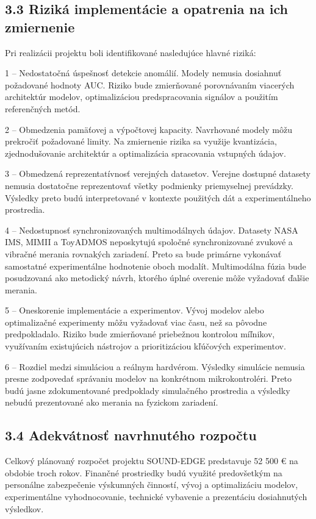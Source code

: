 \documentclass[10pt,a4paper]{article}
\begin{document}
\subsection*{3.3 Riziká implementácie
a opatrenia na ich zmiernenie}

Pri realizácii projektu boli identifikované nasledujúce hlavné riziká:

1 – Nedostatočná úspešnosť detekcie anomálií. Modely nemusia dosiahnuť požadované hodnoty AUC. Riziko bude zmierňované porovnávaním viacerých architektúr modelov, optimalizáciou predspracovania signálov a použitím referenčných metód.

2 – Obmedzenia pamäťovej a výpočtovej kapacity. Navrhované modely môžu prekročiť požadované limity. Na zmiernenie rizika sa využije kvantizácia, zjednodušovanie architektúr a optimalizácia spracovania vstupných údajov.

3 – Obmedzená reprezentatívnosť verejných datasetov. Verejne dostupné datasety nemusia dostatočne reprezentovať všetky podmienky priemyselnej prevádzky. Výsledky preto budú interpretované v kontexte použitých dát a experimentálneho prostredia.

4 – Nedostupnosť synchronizovaných multimodálnych údajov. Datasety NASA IMS, MIMII a ToyADMOS neposkytujú spoločné synchronizované zvukové a vibračné merania rovnakých zariadení. Preto sa bude primárne vykonávať samostatné experimentálne hodnotenie oboch modalít. Multimodálna fúzia bude posudzovaná ako metodický návrh, ktorého úplné overenie môže vyžadovať ďalšie merania.

5 – Oneskorenie implementácie a experimentov. Vývoj modelov alebo optimalizačné experimenty môžu vyžadovať viac času, než sa pôvodne predpokladalo. Riziko bude zmierňované priebežnou kontrolou míľnikov, využívaním existujúcich nástrojov a prioritizáciou kľúčových experimentov.

6 – Rozdiel medzi simuláciou a reálnym hardvérom. Výsledky simulácie nemusia presne zodpovedať správaniu modelov na konkrétnom mikrokontroléri. Preto budú jasne zdokumentované predpoklady simulačného prostredia a výsledky nebudú prezentované ako merania na fyzickom zariadení.

\subsection*{3.4 Adekvátnosť navrhnutého rozpočtu}

Celkový plánovaný rozpočet projektu SOUND-EDGE predstavuje 52 500 € na obdobie troch rokov. Finančné prostriedky budú využité predovšetkým na personálne zabezpečenie výskumných činností, vývoj a optimalizáciu modelov, experimentálne vyhodnocovanie, technické vybavenie a prezentáciu dosiahnutých výsledkov.
\end{document}

